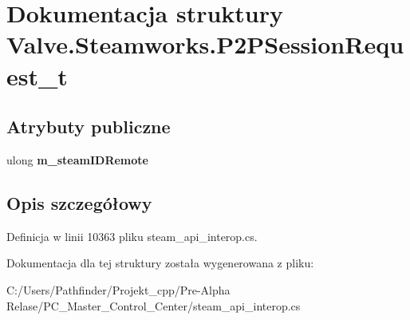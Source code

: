 \hypertarget{struct_valve_1_1_steamworks_1_1_p2_p_session_request__t}{}\section{Dokumentacja struktury Valve.\+Steamworks.\+P2\+P\+Session\+Request\+\_\+t}
\label{struct_valve_1_1_steamworks_1_1_p2_p_session_request__t}
\subsection*{Atrybuty publiczne}
\begin{DoxyCompactItemize}
\item 
\mbox{\label{struct_valve_1_1_steamworks_1_1_p2_p_session_request__t_aafd188db5b48ca4aacd43760a9b1cefa}} 
ulong {\bfseries m\+\_\+steam\+I\+D\+Remote}
\end{DoxyCompactItemize}


\subsection{Opis szczegółowy}


Definicja w linii 10363 pliku steam\+\_\+api\+\_\+interop.\+cs.



Dokumentacja dla tej struktury została wygenerowana z pliku\+:\begin{DoxyCompactItemize}
\item 
C\+:/\+Users/\+Pathfinder/\+Projekt\+\_\+cpp/\+Pre-\/\+Alpha Relase/\+P\+C\+\_\+\+Master\+\_\+\+Control\+\_\+\+Center/steam\+\_\+api\+\_\+interop.\+cs\end{DoxyCompactItemize}
